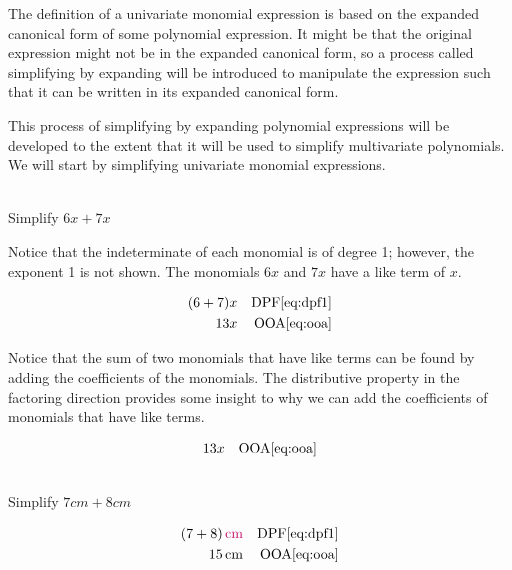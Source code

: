 \documentclass[20150903-160354-rs2.2-MarksMathNotebook.tex]{subfiles}
\begin{document}
The definition of a univariate monomial expression is based on the expanded canonical form of some polynomial expression.  It might be that the original expression might not be in the expanded canonical form, so a process called \alert{simplifying by expanding} will be introduced to manipulate the expression such that it can be written in its expanded canonical form.

This process of simplifying by expanding polynomial expressions will be developed to the extent that it will be used to simplify multivariate polynomials.  We will start by simplifying univariate monomial expressions.


\begin{example}[id:20141120-203846] \label{20141120-203846} \hfill \\

Simplify $6x+7x$

\soln

\solnsteps

Notice that the indeterminate of each monomial is of degree 1; however, the exponent 1 is not shown.  The monomials $6x$ and $7x$ have a like term of $x$.

\begin{align*}
(6+7)x && \text{DPF} \eqref{eq:dpf1} \\
13x && \text{OOA} \eqref{eq:ooa}
\end{align*}

Notice that the sum of two monomials that have like terms can be found by adding the coefficients of the monomials.  The distributive property in the factoring direction provides some insight to why we can add the coefficients of monomials that have like terms.\\

\soln

\lesssteps
\begin{align*}
13x && \text{OOA} \eqref{eq:ooa}
\end{align*}

\end{example}



\begin{example}[id:20141027-075159]\label{20141027-075159} \hfill \\

Simplify $7\unit{cm}+8\unit{cm}$

\soln

\solnsteps
\begin{align*}
(7+8)\alert{\unit{cm}}  &&\text{DPF}\eqref{eq:dpf1} \\
15\unit{cm}  &&\text{OOA} \eqref{eq:ooa}
\end{align*}
\end{example}
\end{document}
